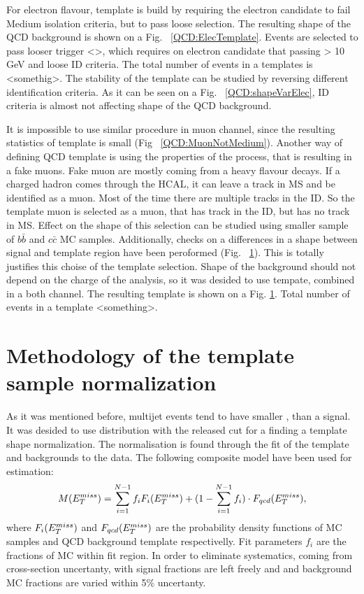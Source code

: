For electron flavour, template is build by requiring the electron candidate to fail Medium isolation criteria, but to pass loose selection.  The resulting shape of the QCD background is shown on a Fig. ~\ref{QCD:ElecTemplate}. Events are selected to pass looser trigger <>, which requires on electron candidate that passing \ptl > 10 GeV and loose ID criteria. 
The total number of events in a templates is <somethig>.  The stability of the template can be studied by reversing different identification criteria. As it can be seen on a Fig. ~\ref{QCD:shapeVarElec}, ID criteria is almost not affecting shape of the QCD background. 

It is impossible to use similar procedure in muon channel, since the resulting statistics of template is small (Fig ~\ref{QCD:MuonNotMedium}). Another way of defining QCD template is using the properties of the process, that is resulting in a fake muons. Fake muon are mostly coming from a heavy flavour decays. If a charged hadron comes through the HCAL, it can leave a track in MS and be identified as a muon. Most of the time there are multiple tracks in the ID. So the template muon is selected as a muon, that has track in the ID, but has no track in MS. Effect on the shape of this selection can be studied using smaller sample of $b\bar{b}$ and $c\bar{c}$ MC samples. Additionally, checks on a differences in a shape between signal and template region have been peroformed (Fig. ~\ref{}). This is totally justifies this choise of the template selection. Shape of the background should not depend on the charge of the analysis, so it was desided to use tempate, combined in a both channel. The resulting template is shown on a Fig. \ref{}. 
Total number of events in a template <something>.

\section{Methodology of the template sample normalization}
As it was mentioned before, multijet events tend to have smaller \etmiss, than a signal. It was desided to use \etmiss distribution with the released \etmiss cut for a finding a template shape normalization. The normalisation is found through the \chiD fit of the template and backgrounds to the data. The following composite model have been used for estimation:
\begin{equation}
M(E_T^{miss}) = \sum_{i=1}^{N-1}f_iF_i(E_T^{miss}) + (1- \sum_{i=1}^{N-1} f_i)\cdot F_{qcd}(E_T^{miss}),
\end{equation}
where $F_i(E_T^{miss})$ and $ F_{qcd}(E_T^{miss})$ are the probability density functions of MC samples and QCD background template respectivelly. Fit parameters $f_i$ are the fractions of MC within fit region. In order to eliminate systematics, coming from cross-section uncertanty, with signal fractions are left freely and and background MC fractions are varied within 5\% uncertanty. 

